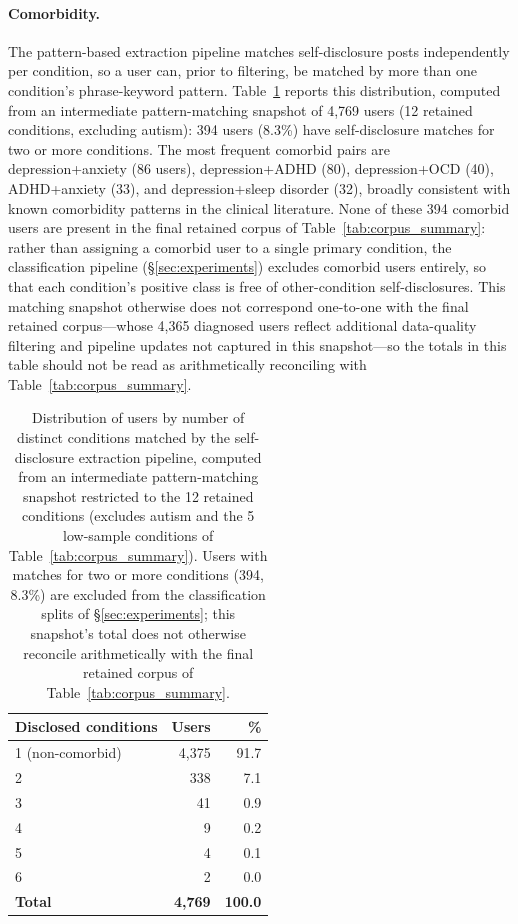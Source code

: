 \documentclass[11pt]{article}
\begin{document}
\paragraph{Comorbidity.} The pattern-based extraction pipeline matches self-disclosure posts independently per condition, 
so a user can, prior to filtering, be matched by more than one condition's phrase-keyword pattern. Table~\ref{tab:comorbidity} 
reports this distribution, computed from an intermediate pattern-matching snapshot of 4,769 users (12 retained conditions, excluding autism): 
394 users (8.3\%) have self-disclosure matches for two or more conditions. 
The most frequent comorbid pairs are depression+anxiety (86 users), depression+ADHD (80), depression+OCD (40), ADHD+anxiety (33), and depression+sleep disorder (32), broadly consistent with known comorbidity patterns in the clinical literature. None of these 394 comorbid users are present in the final retained corpus of Table~\ref{tab:corpus_summary}: rather than assigning a comorbid user to a single primary condition, the classification pipeline (§\ref{sec:experiments}) excludes comorbid users entirely, so that each condition's positive class is free of other-condition self-disclosures. This matching snapshot otherwise does not correspond one-to-one with the final retained corpus---whose 4,365 diagnosed users reflect additional data-quality filtering and pipeline updates not captured in this snapshot---so the totals in this table should not be read as arithmetically reconciling with Table~\ref{tab:corpus_summary}.

\begin{table}[h]
\centering
\small
\begin{tabular}{lrr}
\toprule
\textbf{Disclosed conditions} & \textbf{Users} & \textbf{\%} \\
\midrule
1 (non-comorbid) & 4,375 & 91.7 \\
2                & 338   & 7.1 \\
3                & 41    & 0.9 \\
4                & 9     & 0.2 \\
5                & 4     & 0.1 \\
6                & 2     & 0.0 \\
\midrule
\textbf{Total}   & \textbf{4,769} & \textbf{100.0} \\
\bottomrule
\end{tabular}
\caption{Distribution of users by number of distinct conditions matched
by the self-disclosure extraction pipeline, computed from an
intermediate pattern-matching snapshot restricted to the 12 retained
conditions (excludes autism and the 5 low-sample conditions of
Table~\ref{tab:corpus_summary}). Users with matches for two or more
conditions (394, 8.3\%) are excluded from the classification splits of
§\ref{sec:experiments}; this snapshot's total does not otherwise
reconcile arithmetically with the final retained corpus of
Table~\ref{tab:corpus_summary}.}
\label{tab:comorbidity}
\end{table}
\end{document}
